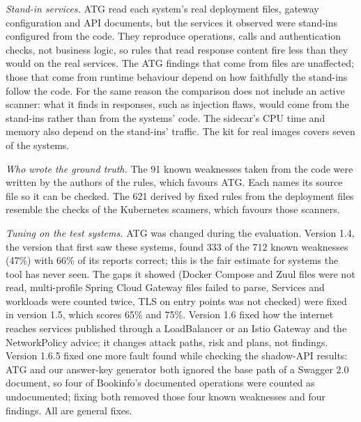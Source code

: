 \documentclass[conference]{IEEEtran}
\begin{document}
\textit{Stand-in services.} ATG read each system's real deployment files, gateway configuration and API documents, but the services it observed were stand-ins configured from the code. They reproduce operations, calls and authentication checks, not business logic, so rules that read response content fire less than they would on the real services. The ATG findings that come from files are unaffected; those that come from runtime behaviour depend on how faithfully the stand-ins follow the code. For the same reason the comparison does not include an active scanner: what it finds in responses, such as injection flaws, would come from the stand-ins rather than from the systems' code. The sidecar's CPU time and memory also depend on the stand-ins' traffic. The kit for real images covers seven of the systems.

\textit{Who wrote the ground truth.} The 91 known weaknesses taken from the code were written by the authors of the rules, which favours ATG. Each names its source file so it can be checked. The 621 derived by fixed rules from the deployment files resemble the checks of the Kubernetes scanners, which favours those scanners.

\textit{Tuning on the test systems.} ATG was changed during the evaluation. Version 1.4, the version that first saw these systems, found 333 of the 712 known weaknesses (47\%) with 66\% of its reports correct; this is the fair estimate for systems the tool has never seen. The gaps it showed (Docker Compose and Zuul files were not read, multi-profile Spring Cloud Gateway files failed to parse, Services and workloads were counted twice, TLS on entry points was not checked) were fixed in version 1.5, which scores 65\% and 75\%. Version 1.6 fixed how the internet reaches services published through a LoadBalancer or an Istio Gateway and the NetworkPolicy advice; it changes attack paths, risk and plans, not findings. Version 1.6.5 fixed one more fault found while checking the shadow-API results: ATG and our answer-key generator both ignored the base path of a Swagger 2.0 document, so four of Bookinfo's documented operations were counted as undocumented; fixing both removed those four known weaknesses and four findings. All are general fixes.
\end{document}
